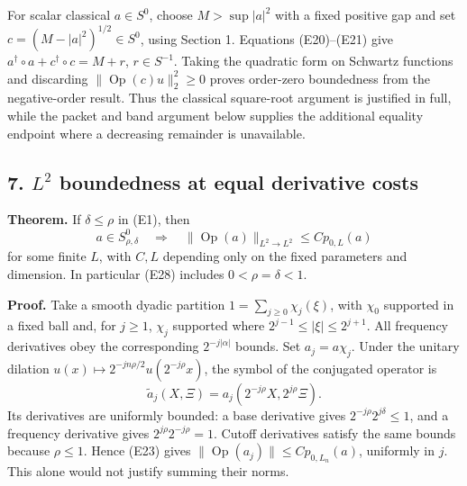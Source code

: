 \documentclass[
  11pt,
]{article}
\begin{document}
For scalar classical \(a\in S^0\), choose \(M>\sup|a|^2\) with a fixed
positive gap and set \(c=(M-|a|^2)^{1/2}\in S^0\), using Section 1.
Equations (E20)--(E21) give \(a^\dagger\circ a+c^\dagger\circ c=M+r\),
\(r\in S^{-1}\). Taking the quadratic form on Schwartz functions and
discarding \(\|\operatorname{Op}(c)u\|_2^2\geq0\) proves order-zero
boundedness from the negative-order result. Thus the classical
square-root argument is justified in full, while the packet and band
argument below supplies the additional equality endpoint where a
decreasing remainder is unavailable.

\subsection{\texorpdfstring{7. \(L^2\) boundedness at equal derivative
costs}{7. L\^{}2 boundedness at equal derivative costs}}\label{l2-boundedness-at-equal-derivative-costs}

\textbf{Theorem.} If \(\delta\leq\rho\) in (E1), then \[
a\in S^0_{\rho,\delta}
\quad\Longrightarrow\quad
\|\operatorname{Op}(a)\|_{L^2\to L^2}
\leq C p_{0,L}(a)
\tag{E28}
\] for some finite \(L\), with \(C,L\) depending only on the fixed
parameters and dimension. In particular (E28) includes
\(0<\rho=\delta<1\).

\textbf{Proof.} Take a smooth dyadic partition
\(1=\sum_{j\geq0}\chi_j(\xi)\), with \(\chi_0\) supported in a fixed
ball and, for \(j\geq1\), \(\chi_j\) supported where
\(2^{j-1}\leq|\xi|\leq2^{j+1}\). All frequency derivatives obey the
corresponding \(2^{-j|\alpha|}\) bounds. Set \(a_j=a\chi_j\). Under the
unitary dilation \(u(x)\mapsto 2^{-jn\rho/2}u(2^{-j\rho}x)\), the symbol
of the conjugated operator is \[
\widetilde a_j(X,\Xi)=a_j(2^{-j\rho}X,2^{j\rho}\Xi).
\tag{E29}
\] Its derivatives are uniformly bounded: a base derivative gives
\(2^{-j\rho}2^{j\delta}\leq1\), and a frequency derivative gives
\(2^{j\rho}2^{-j\rho}=1\). Cutoff derivatives satisfy the same bounds
because \(\rho\leq1\). Hence (E23) gives
\(\|\operatorname{Op}(a_j)\|\leq C p_{0,L_n}(a)\), uniformly in \(j\).
This alone would not justify summing their norms.
\end{document}
